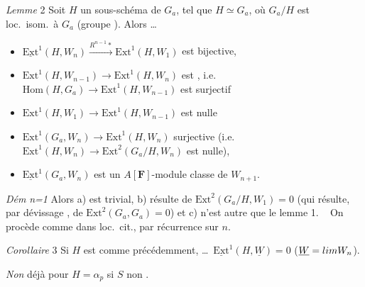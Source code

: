 \documentclass[11pt,a4paper]{article}
\begin{document}
\emph{Lemme} 2 \quad Soit $H$ un sous-schéma  \add{\ill{}} de
$G_a$, tel \struck{\ill{}} que \ill{} \ill{} $H\simeq G_a$, où $G_a/H$ est
loc.\ isom.\ à $G_a$ (groupe ). Alors \ldots
\begin{itemize}
  \item[a)] $\underline{\mathrm{Ext}}^1(H,W_n)\xrightarrow{R^{n-1}*}
  \mathrm{Ext}^1(H,W_1)$ est bijective,


  \item[a$_1$)] $\mathrm{Ext}^1(H,W_{n-1})\to\mathrm{Ext}^1(H,W_n)$ est
  , i.e.\ $\mathrm{Hom}(H,G_a)\to\mathrm{Ext}^1(H,W_{n-1})$
  est surjectif
  \item[a$_2$)] $\mathrm{Ext}^1(H,W_1)\to\mathrm{Ext}^1(H,W_{n-1})$ est
  nulle
  \item[b)] $\mathrm{Ext}^1(G_a,W_n)\to\mathrm{Ext}^1(H,W_n)$ surjective
  (i.e.\ $\mathrm{Ext}^1(H,W_n)\to\mathrm{Ext}^2(G_a/H,W_n)$ est nulle),
  \item[c)] $\underline{\mathrm{Ext}}^1(G_a,W_n)$ est un
  $A[\mathbf{F}]$-module 
  \struck{\ill{} \ill{} \ill{}} classe \struck{\ill{}} de $W_{n+1}$.
\end{itemize}

\emph{Dém} \emph{n=1} Alors a) est trivial, b) résulte de
$\mathrm{Ext}^2(G_a/H,W_1)=0$ (qui résulte, par dévissage \struck{\ill{}},
de  $\mathrm{Ext}^2(G_a,G_a)=0$) et c) n'est autre que le lemme 1.
\  On procède comme dans
\struck{\ill{}} loc.\ cit., par récurrence sur $n$.

\emph{Corollaire} 3 \quad Si $H$ est comme précédemment, \ldots\
$\underline{\mathrm{Ext}}^1(H,\underline{W})=0$
($\underline{W}=\varinjlim W_n$).

\emph{Non} déjà pour $H=\alpha_p$ si $S$  non .
\end{document}
